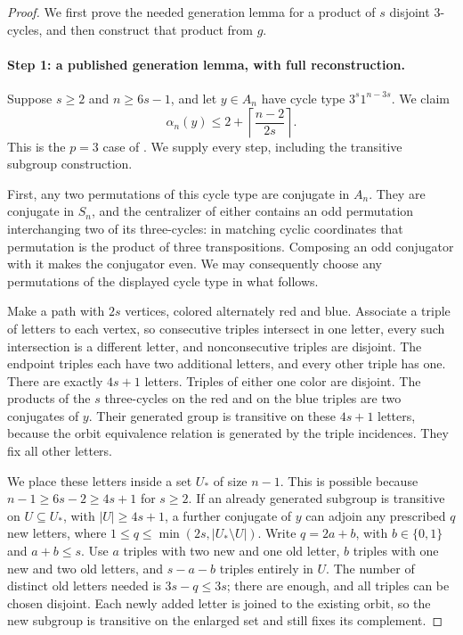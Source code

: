\begin{proof}
We first prove the needed generation lemma for a product of $s$
disjoint $3$-cycles, and then construct that product from $g$.

\paragraph{Step 1: a published generation lemma, with full reconstruction.}
Suppose $s\ge2$ and $n\ge6s-1$, and let $y\in A_n$ have cycle type
$3^s1^{n-3s}$. We claim
\[
        \alpha_n(y)\le 2+\left\lceil\frac{n-2}{2s}\right\rceil.
        \tag{SCG.2}
\]
This is the $p=3$ case of \cite[Corollary2.2, author copy p.4]{SF:Hall1995Finitary}.
We supply every step, including the transitive subgroup construction.

First, any two permutations of this cycle type are conjugate in $A_n$.
They are conjugate in $S_n$, and the centralizer of either contains an
odd permutation interchanging two of its three-cycles: in matching
cyclic coordinates that permutation is the product of three
transpositions. Composing an odd conjugator with it makes the
conjugator even. We may consequently choose any permutations of the
displayed cycle type in what follows.

Make a path with $2s$ vertices, colored alternately red and blue.
Associate a triple of letters to each vertex, so consecutive triples
intersect in one letter, every such intersection is a different letter,
and nonconsecutive triples are disjoint. The endpoint triples each
have two additional letters, and every other triple has one. There
are exactly $4s+1$ letters. Triples of either one color are disjoint.
The products of the $s$ three-cycles on the red and on the blue
triples are two conjugates of $y$. Their generated group is transitive
on these $4s+1$ letters, because the orbit equivalence relation is
generated by the triple incidences. They fix all other letters.

We place these letters inside a set $U_*$ of size $n-1$.
This is possible because $n-1\ge6s-2\ge4s+1$ for $s\ge2$.
If an already generated subgroup is transitive on $U\subseteq U_*$,
with $|U|\ge4s+1$, a further conjugate of $y$ can adjoin any prescribed
$q$ new letters, where $1\le q\le\min(2s,|U_*\setminus U|)$.
Write $q=2a+b$, with $b\in\{0,1\}$ and $a+b\le s$.
Use $a$ triples with two new and one old letter, $b$ triples with
one new and two old letters, and $s-a-b$ triples entirely in $U$.
The number of distinct old letters needed is $3s-q\le3s$;
there are enough, and all triples can be chosen disjoint.
Each newly added letter is joined to the existing orbit, so the
new subgroup is transitive on the enlarged set and still fixes
its complement.


\end{proof}
